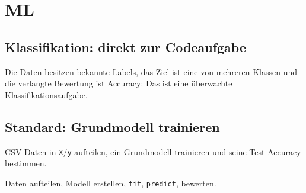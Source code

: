 \section{ML}\label{sec:09-ml}


\subsection{Klassifikation: direkt zur Codeaufgabe}\label{sec:09-klassifikation-start}

\begin{statementbox}
Die Daten besitzen bekannte Labels, das Ziel ist eine von mehreren Klassen und
die verlangte Bewertung ist Accuracy: Das ist eine überwachte Klassifikationsaufgabe.
\end{statementbox}

\begin{contentbox}
\begin{factlist}
\end{factlist}
\end{contentbox}

\subsection{Standard: Grundmodell trainieren}\label{sec:09-daten-pruefen}
 CSV-Daten in \texttt{X}/\texttt{y} aufteilen, ein Grundmodell trainieren und seine Test-Accuracy bestimmen.

\begin{statementbox}[Merksatz]
Daten aufteilen, Modell erstellen, \texttt{fit}, \texttt{predict}, bewerten.
\end{statementbox}

